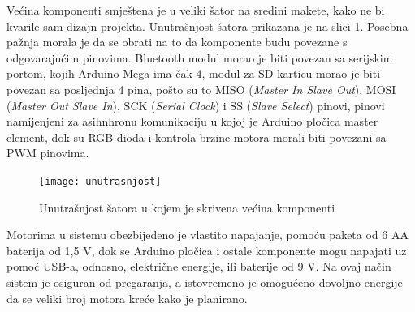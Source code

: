 Većina komponenti smještena je u veliki šator na sredini makete, kako ne bi kvarile sam dizajn projekta. Unutrašnjost šatora prikazana je na slici \ref{fig:Slika_sator}. Posebna pažnja morala je da se obrati na to da komponente budu povezane s odgovarajućim pinovima. Bluetooth modul morao je biti povezan sa serijskim portom, kojih Arduino Mega ima čak 4, modul za SD karticu morao je biti povezan sa posljednja 4 pina, pošto su to MISO (\textit{Master In Slave Out}), MOSI (\textit{Master Out Slave In}), SCK (\textit{Serial Clock}) i SS (\textit{Slave Select}) pinovi, pinovi namijenjeni za asihnhronu komunikaciju u kojoj je Arduino pločica master element, dok su RGB dioda i kontrola brzine motora morali biti povezani sa PWM pinovima.
\begin{figure}[h!]
  \centering
  \texttt{[image: unutrasnjost]}
  \caption{Unutrašnjost šatora u kojem je skrivena većina komponenti}
  \label{fig:Slika_sator}
\end{figure}

Motorima u sistemu obezbijeđeno je vlastito napajanje, pomoću paketa od 6 AA baterija od 1,5 V, dok se Arduino pločica i ostale komponente mogu napajati uz pomoć USB-a, odnosno, električne energije, ili baterije od 9 V. Na ovaj način sistem je osiguran od pregaranja, a istovremeno je omogućeno dovoljno energije da se veliki broj motora kreće kako je planirano.
\